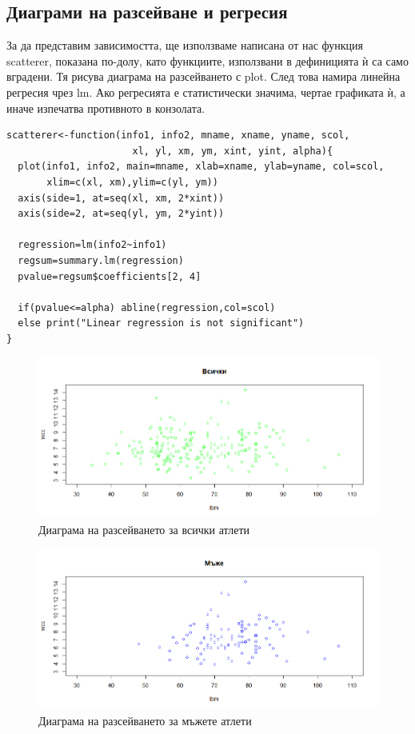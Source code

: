 \documentclass[12pt]{article} %
\begin{document}
\begin{large}
  \subsection{Диаграми на разсейване и регресия}
  За да представим зависимостта, ще използваме написана от нас функция scatterer, показана по-долу, като функциите, използвани в дефиницията ѝ са само вградени. Тя рисува диаграма на разсейването с plot. След това намира линейна регресия чрез lm. Ако регресията е статистически значима, чертае графиката ѝ, а иначе изпечатва противното в конзолата.

\begin{verbatim}
scatterer<-function(info1, info2, mname, xname, yname, scol,
                      xl, yl, xm, ym, xint, yint, alpha){
  plot(info1, info2, main=mname, xlab=xname, ylab=yname, col=scol,
       xlim=c(xl, xm),ylim=c(yl, ym))
  axis(side=1, at=seq(xl, xm, 2*xint))
  axis(side=2, at=seq(yl, ym, 2*yint))

  regression=lm(info2~info1)
  regsum=summary.lm(regression)
  pvalue=regsum$coefficients[2, 4]

  if(pvalue<=alpha) abline(regression,col=scol)
  else print("Linear regression is not significant")
}
\end{verbatim}

  \begin{figure}[!h!]
    \includegraphics[width=\textwidth,height=\textheight,keepaspectratio]{pics/scatterall}
    \caption{Диаграма на разсейването за всички атлети}
  \end{figure}

  \begin{figure}[!h!]
    \includegraphics[width=\textwidth,height=\textheight,keepaspectratio]{pics/scattermen}
    \caption{Диаграма на разсейването за мъжете атлети}
  \end{figure}


\end{large}
\end{document}
